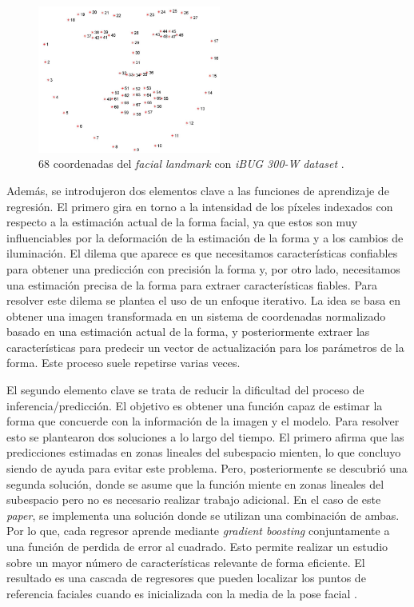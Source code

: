 \begin{figure}[htp]
	\centering
	\includegraphics[width=6cm]{imagenes/facial_landmarks_68markup.jpg}
	\caption[68 coordenadas del \textit{facial landmark} con \textit{iBUG 300-W} \textit{dataset}]{68 coordenadas del \textit{facial landmark} con \textit{iBUG 300-W} \textit{dataset} \cite{ibug}.}
	\label{fig:dlibPoints}
\end{figure}

Además, se introdujeron dos elementos clave a las funciones de aprendizaje de regresión. El primero gira en torno a la intensidad de los píxeles indexados con respecto a la estimación actual de la forma facial, ya que estos son muy influenciables por la deformación de la estimación de la forma y a los cambios de iluminación. El dilema que aparece es que necesitamos características confiables para obtener una predicción con precisión la forma y, por otro lado, necesitamos una estimación precisa de la forma para extraer características fiables. Para resolver este dilema se plantea el uso de un enfoque iterativo. La idea se basa en obtener una imagen transformada en un sistema de coordenadas normalizado basado en una estimación actual de la forma, y posteriormente extraer las características para predecir un vector de actualización para los parámetros de la forma. Este proceso suele repetirse varias veces.

El segundo elemento clave se trata de reducir la dificultad del proceso de inferencia/predicción. El objetivo es obtener una función capaz de estimar la forma que concuerde con la información de la imagen y el modelo. 
Para resolver esto se plantearon dos soluciones a lo largo del tiempo. El primero afirma que las predicciones estimadas en zonas lineales del subespacio mienten, lo que concluyo siendo de ayuda para evitar este problema. Pero, posteriormente se descubrió una segunda solución, donde se asume que la función miente en zonas lineales del subespacio pero no es necesario realizar trabajo adicional. En el caso de este \textit{paper}, se implementa una solución donde se utilizan una combinación de ambas. Por lo que, cada regresor aprende mediante \textit{gradient boosting} conjuntamente a una función de perdida de error al cuadrado.
Esto permite realizar un estudio sobre un mayor número de características relevante de forma eficiente. El resultado es una cascada de regresores que pueden localizar los puntos de referencia faciales cuando es inicializada con la media de la pose facial \cite{faceLandmark}.

